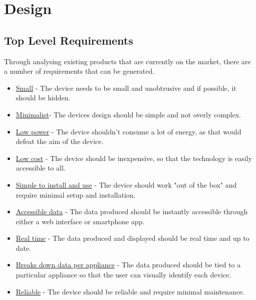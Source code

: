 \documentclass[draft,preprint,12pt,3p]{elsarticle}
\begin{document}

\section{Design}
\subsection{Top Level Requirements}

Through analysing existing products that are currently on the market, there are a number of requirements that can be generated. 

\begin{itemize}
  \item \underline{Small} - The device needs to be small and unobtrusive and if possible, it should be hidden.
  \item \underline{Minimalist}- The devices design should be simple and not overly complex.
  \item \underline{Low power} - The device shouldn't consume a lot of energy, as that would defeat the aim of the device.
  \item \underline{Low cost} - The device should be inexpensive, so that the technology is easily accessible to all.
  \item \underline{Simple to install and use} - The device should work "out of the box" and require minimal setup and installation.
  \item \underline{Accessible data}  - The data produced should be instantly accessible through either a web interface or smartphone app.
  \item \underline{Real time} - The data produced and displayed should be real time and up to date.
  \item \underline{Breaks down data per appliance} - The data produced should be tied to a particular appliance so that the user can visually identify each device.
  \item \underline{Reliable} - The device should be reliable and require minimal maintenance.
\end{itemize}
\end{document}

